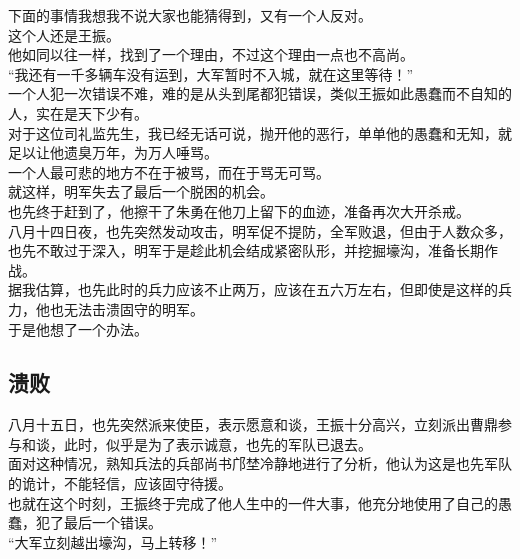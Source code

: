 \begin{multicols}{\theparacolNo}
下面的事情我想我不说大家也能猜得到，又有一个人反对。\\

这个人还是王振。\\

他如同以往一样，找到了一个理由，不过这个理由一点也不高尚。\\

“我还有一千多辆车没有运到，大军暂时不入城，就在这里等待！”\\

一个人犯一次错误不难，难的是从头到尾都犯错误，类似王振如此愚蠢而不自知的人，实在是天下少有。\\

对于这位司礼监先生，我已经无话可说，抛开他的恶行，单单他的愚蠢和无知，就足以让他遗臭万年，为万人唾骂。\\

一个人最可悲的地方不在于被骂，而在于骂无可骂。\\

就这样，明军失去了最后一个脱困的机会。\\

也先终于赶到了，他擦干了朱勇在他刀上留下的血迹，准备再次大开杀戒。\\

八月十四日夜，也先突然发动攻击，明军促不提防，全军败退，但由于人数众多，也先不敢过于深入，明军于是趁此机会结成紧密队形，并挖掘壕沟，准备长期作战。\\

据我估算，也先此时的兵力应该不止两万，应该在五六万左右，但即使是这样的兵力，他也无法击溃固守的明军。\\

于是他想了一个办法。\\

\subsection{溃败}
八月十五日，也先突然派来使臣，表示愿意和谈，王振十分高兴，立刻派出曹鼎参与和谈，此时，似乎是为了表示诚意，也先的军队已退去。\\

面对这种情况，熟知兵法的兵部尚书邝埜冷静地进行了分析，他认为这是也先军队的诡计，不能轻信，应该固守待援。\\

也就在这个时刻，王振终于完成了他人生中的一件大事，他充分地使用了自己的愚蠢，犯了最后一个错误。\\

“大军立刻越出壕沟，马上转移！”\\


\end{multicols}
